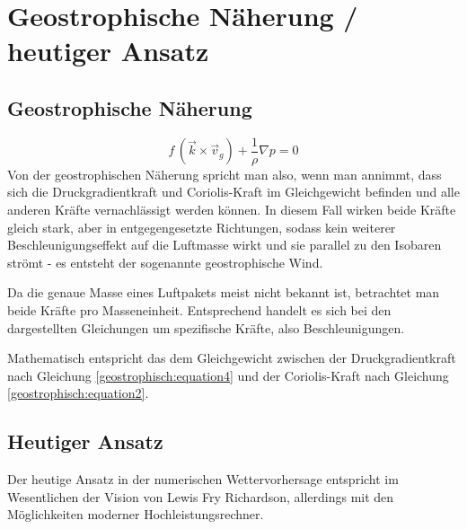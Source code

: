 %
%
%
%
\section{Geostrophische Näherung / heutiger Ansatz
\label{geostrophisch:section:geoNäherung}}
\subsection{Geostrophische Näherung}
\begin{equation}
f\, (\vec{k} \times \vec{v}_g) 
+
\frac{1}{\rho} \nabla p
=
0
\label{geostrophisch:equation5}
\end{equation}
Von der geostrophischen Näherung spricht man also, wenn man annimmt, dass sich die Druckgradientkraft und Coriolis-Kraft im Gleichgewicht befinden und alle anderen Kräfte vernachlässigt werden können. In diesem Fall wirken beide Kräfte gleich stark, aber in entgegengesetzte Richtungen, sodass kein weiterer Beschleunigungseffekt auf die Luftmasse wirkt und sie parallel zu den Isobaren strömt - es entsteht der sogenannte geostrophische Wind.

\vspace{1em}

Da die genaue Masse eines Luftpakets meist nicht bekannt ist, betrachtet man beide Kräfte pro Masseneinheit. Entsprechend handelt es sich bei den dargestellten Gleichungen um spezifische Kräfte, also Beschleunigungen.

\vspace{1em}

Mathematisch entspricht das dem Gleichgewicht zwischen der Druckgradientkraft nach Gleichung \eqref{geostrophisch:equation4} und der Coriolis-Kraft nach Gleichung \eqref{geostrophisch:equation2}.

\subsection{Heutiger Ansatz}

Der heutige Ansatz in der numerischen Wettervorhersage entspricht im Wesentlichen der Vision von Lewis Fry Richardson, allerdings mit den Möglichkeiten moderner Hochleistungsrechner.

